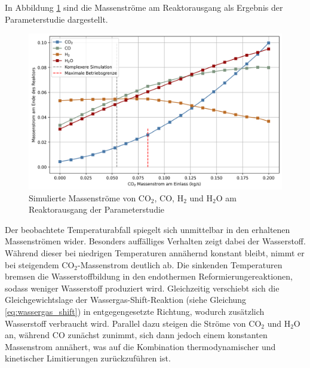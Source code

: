     In Abbildung \ref{fig:parameterstudie_massenströme} sind die Massenströme am Reaktorausgang als Ergebnis der Parameterstudie dargestellt. 
    \begin{figure}[H]
        \centering
        \includegraphics[width=0.9\linewidth]{img/Parameterstudie_CO2/Parameterstudie_CO2_Massenstrom_Ende.png}
        \caption{Simulierte Massenströme von CO$_2$, CO, H$_2$ und H$_2$O am Reaktorausgang der Parameterstudie}
        \label{fig:parameterstudie_massenströme}
    \end{figure}
    Der beobachtete Temperaturabfall spiegelt sich unmittelbar in den erhaltenen Massenströmen wider. Besonders auffälliges Verhalten zeigt dabei der Wasserstoff. Während dieser bei niedrigen Temperaturen annähernd konstant bleibt, nimmt er bei steigendem CO$_2$-Massenstrom deutlich ab. Die sinkenden Temperaturen bremsen die Wasserstoffbildung in den endothermen Reformierungereaktionen, sodass weniger Wasserstoff produziert wird. Gleichzeitig verschiebt sich die Gleichgewichtslage der Wassergas-Shift-Reaktion (siehe Gleichung \ref{eq:wassergas_shift}) in entgegengesetzte Richtung, wodurch zusätzlich Wasserstoff verbraucht wird. Parallel dazu steigen die Ströme von CO$_2$ und H$_2$O an, während CO zunächst zunimmt, sich dann jedoch einem konstanten Massenstrom annähert, was auf die Kombination thermodynamischer und kinetischer Limitierungen zurückzuführen ist. 

